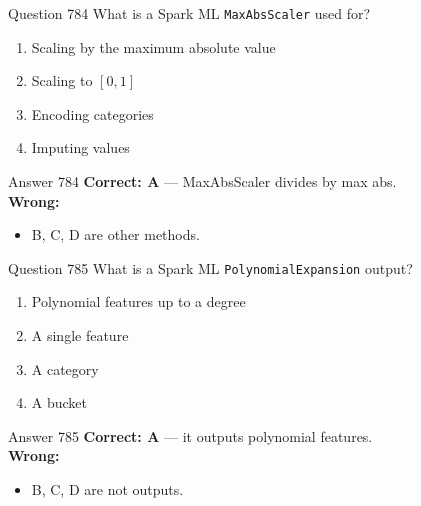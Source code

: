 \documentclass[aspectratio=169,11pt]{beamer}
\begin{document}
	\begin{frame}{Question 784}
		What is a Spark ML \texttt{MaxAbsScaler} used for?
		\begin{enumerate}[label=\Alph*.]
			\item Scaling by the maximum absolute value
			\item Scaling to $[0,1]$
			\item Encoding categories
			\item Imputing values
		\end{enumerate}
	\end{frame}
	\begin{frame}{Answer 784}
		\textbf{Correct: A} --- MaxAbsScaler divides by max abs.\\
		\vspace{0.5em}
		\textbf{Wrong:}
		\begin{itemize}
			\item B, C, D are other methods.
		\end{itemize}
	\end{frame}
	
	\begin{frame}{Question 785}
		What is a Spark ML \texttt{PolynomialExpansion} output?
		\begin{enumerate}[label=\Alph*.]
			\item Polynomial features up to a degree
			\item A single feature
			\item A category
			\item A bucket
		\end{enumerate}
	\end{frame}
	\begin{frame}{Answer 785}
		\textbf{Correct: A} --- it outputs polynomial features.\\
		\vspace{0.5em}
		\textbf{Wrong:}
		\begin{itemize}
			\item B, C, D are not outputs.
		\end{itemize}
	\end{frame}
	
\end{document}
